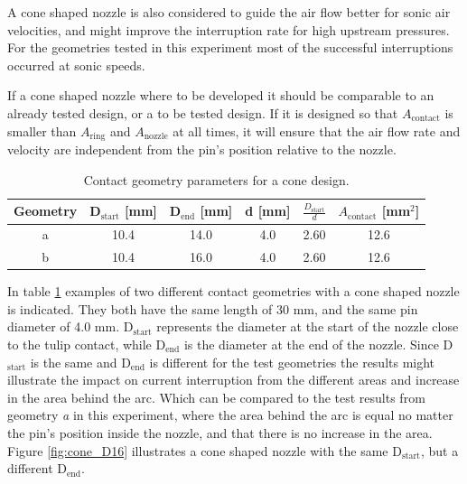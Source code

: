 \documentclass[10pt,a4paper,twoside]{article}
\begin{document}
A cone shaped nozzle is also considered to guide the air flow better for sonic air velocities, and might improve the interruption rate for high upstream pressures. For the geometries tested in this experiment most of the successful interruptions occurred at sonic speeds.

If a cone shaped nozzle where to be developed it should be comparable to an already tested design, or a to be tested design. If it is designed so that $A_\mathrm{{contact}}$ is smaller than $A_\mathrm{{ring}}$ and $A_\mathrm{{nozzle}}$ at all times, it will ensure that the air flow rate and velocity are independent from the pin's position relative to the nozzle. 

\begin{table}[H]
\center
\caption{Contact geometry parameters for a cone design.}
 \begin{tabular}{|c|c|c|c|c|c|}
\hline 
Geometry & D$_\mathrm{{start}}$ [mm]& D$_\mathrm{{end}}$ [mm] & d [mm] & $\frac{D_\mathrm{{start}}}{d}$ & $A_\mathrm{{contact}}$ [mm$^2$] \\ 
\hline 
a & 10.4 & 14.0 & 4.0 & 2.60 & 12.6  \\ 
\hline 
b & 10.4 & 16.0 & 4.0 & 2.60 & 12.6  \\ 
\hline 
\end{tabular} 
\label{tab:contGeoParaCone}
\end{table}

In table \ref{tab:contGeoParaCone} examples of two different contact geometries with a cone shaped nozzle is indicated. They both have the same length of 30 mm, and the same pin diameter of 4.0 mm. D$_\mathrm{{start}}$ represents the diameter at the start of the nozzle close to the tulip contact, while D$_\mathrm{{end}}$ is the diameter at the end of the nozzle. Since D$_\mathrm{{start}}$ is the same and D$_\mathrm{{end}}$ is different for the test geometries the results might illustrate the impact on current interruption from the different areas and increase in the area behind the arc. Which can be compared to the test results from geometry \textit{a} in this experiment, where the area behind the arc is equal no matter the pin's position inside the nozzle, and that there is no increase in the area. Figure \ref{fig:cone_D16} illustrates a cone shaped nozzle with the same  D$_\mathrm{{start}}$, but a different D$_\mathrm{{end}}$. 
\end{document}
